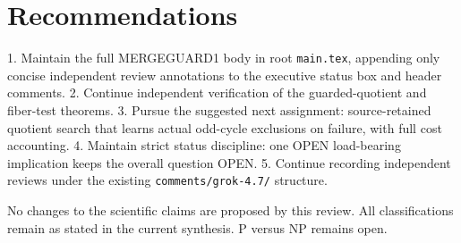 \documentclass{article}
\begin{document}
\section{Recommendations}
1. Maintain the full MERGEGUARD1 body in root \texttt{main.tex}, appending only concise independent review annotations to the executive status box and header comments.
2. Continue independent verification of the guarded-quotient and fiber-test theorems.
3. Pursue the suggested next assignment: source-retained quotient search that learns actual odd-cycle exclusions on failure, with full cost accounting.
4. Maintain strict status discipline: one OPEN load-bearing implication keeps the overall question OPEN.
5. Continue recording independent reviews under the existing \texttt{comments/grok-4.7/} structure.

No changes to the scientific claims are proposed by this review. All classifications remain as stated in the current synthesis. P versus NP remains open.
\end{document}
